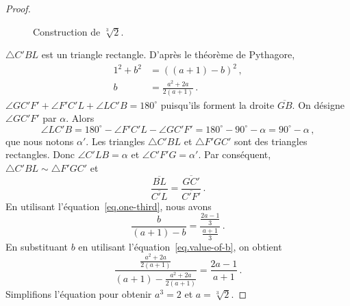 \begin{proof}
\begin{figure}[htbp]

\vspace{-2ex}
\caption{Construction de $\sqrt[3]{2}$.}\label{f.messer3}
\end{figure}

$\triangle C'BL$ est un triangle rectangle. D'après le théorème de Pythagore,
\begin{subequations}
\begin{align}
1^2 + b^2 &= ((a+1)-b)^2\,,\\
b&=\frac{a^2+2a}{2(a+1)}\,.\label{eq.value-of-b}
\end{align}
\end{subequations}
$\angle GC'F' + \angle F'C'L + \angle LC'B = 180^\circ$ puisqu'ils forment la droite $\overline{GB}$. On désigne $\angle GC'F'$ par $\alpha$. Alors 
\[
\angle LC'B=180^\circ - \angle F'C'L - \angle GC'F'= 180^\circ - 90^\circ - \alpha = 90^\circ -\alpha\,,
\]
que nous notons $\alpha'$. Les triangles $\triangle C'BL$ et  $\triangle F'GC'$ sont des triangles rectangles. Donc $\angle C'LB=\alpha$ et $\angle C'F'G=\alpha'$. Par conséquent, $\triangle C'BL\sim\triangle F'GC'$ et 
\[
\frac{\overline{BL}}{\overline{C'L}}=\frac{\overline{GC'}}{\overline{C'F'}}\,.
\]
En utilisant l'équation~\ref{eq.one-third}, nous avons 
\[
\frac{b}{(a+1)-b}=\frac{\displaystyle\frac{2a-1}{3}}{\displaystyle\frac{a+1}{3}}\,.
\]
En substituant $b$ en utilisant l'équation~\ref{eq.value-of-b}, on obtient 
\[
\displaystyle\frac{\displaystyle\frac{a^2+2a}{2(a+1)}}{(a+1)-\displaystyle\frac{a^2+2a}{2(a+1)}}=\frac{2a-1}{a+1}\,.
\]
Simplifions l'équation pour obtenir $a^3=2$ et $a=\sqrt[3]{2}$.
\end{proof}


